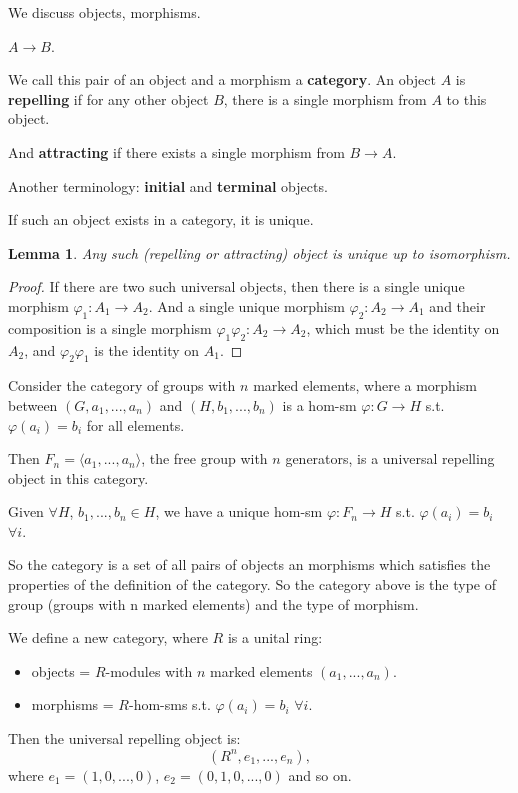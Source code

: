 \documentclass[9pt,reqno,twoside]{amsbook}
\theoremstyle{plain}
\numberwithin{section}{chapter}
\numberwithin{equation}{chapter}
\newtheorem{lem}[theorem]{Lemma}
\theoremstyle{definition}
\theoremstyle{remark}
\theoremstyle{plain}
\renewcommand{\phi}{\varphi}
\begin{document}
We discuss objects, morphisms. 

$A \to B$. 

We call this pair of an object and a morphism a \textbf{category}. An object $A$ is \textbf{repelling} if for any other object $B$, there is a single morphism from $A$ to this object. 

And \textbf{attracting} if there exists a single morphism from $B \to A$. 

Another terminology: \textbf{initial} and \textbf{terminal} objects. 

If such an object exists in a category, it is unique. 

\begin{lem}
Any such (repelling or attracting) object is unique up to isomorphism.  

\end{lem}
\begin{proof}
If there are two such universal objects, then there is a single unique morphism $\phi_1:A_1 \to A_2$. And a single unique morphism $\phi_2:A_2 \to A_1$ and their composition is a single morphism $\phi_1\phi_2:A_2 \to A_2$, which must be the identity on $A_2$, and $\phi_2\phi_1$ is the identity on $A_1$. 
\end{proof}

Consider the category of groups with $n$ marked elements, where a morphism between $(G,a_1,...,a_n)$ and $(H,b_1,...,b_n)$ is a hom-sm $\phi:G \to H$ s.t. $\phi(a_i) = b_i$ for all elements. 

Then $F_n = \langle a_1,...,a_n \rangle$, the free group with $n$ generators, is a universal repelling object in this category. 

Given $\forall H$, $b_1,...,b_n \in H$, we have a unique hom-sm $\phi:F_n \to H$ s.t. $\phi(a_i) = b_i$ $\forall i$. 

So the category is a set of all pairs of objects an morphisms which satisfies the properties of the definition of the category. So the category above is the type of group (groups with n marked elements) and the type of morphism. 

We define a new category, where $R$ is a unital ring:
\begin{itemize}
\item objects = $R$-modules with $n$ marked elements $(a_1,...,a_n)$. 
\item morphisms = $R$-hom-sms s.t. $\phi(a_i) =b_i$ $\forall i$. 
\end{itemize}
Then the universal repelling object is:
$$
(R^n,e_1,...,e_n),
$$
where $e_1 = (1,0,...,0)$, $e_2 = (0,1,0,...,0)$ and so on. 
\end{document}
